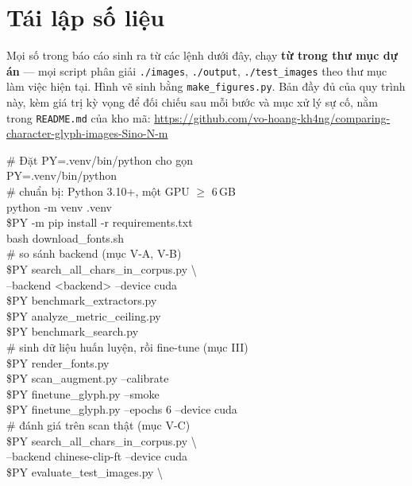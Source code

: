 \documentclass[conference,a4paper]{IEEEtran}
\newcommand{\code}[1]{{\small\texttt{#1}}}
\begin{document}
\appendices
\section{Tái lập số liệu}

Mọi số trong báo cáo sinh ra từ các lệnh dưới đây, chạy \textbf{từ trong thư mục dự án} --- mọi
script phân giải \code{./images}, \code{./output}, \code{./test\_images} theo thư mục làm việc hiện
tại. Hình vẽ sinh bằng \code{make\_figures.py}. Bản đầy đủ của quy trình này, kèm giá trị kỳ vọng
để đối chiếu sau mỗi bước và mục xử lý sự cố, nằm trong \code{README.md} của kho mã:
\url{https://github.com/vo-hoang-kh4ng/comparing-character-glyph-images-Sino-N-m}

{\footnotesize\ttfamily\raggedright
\# Đặt PY=.venv/bin/python cho gọn\\
PY=.venv/bin/python\\[4pt]
\# chuẩn bị: Python 3.10+, một GPU $\geq$ 6\,GB\\
python -m venv .venv\\
\$PY -m pip install -r requirements.txt\\
bash download\_fonts.sh\\[4pt]
\# so sánh backend (mục V-A, V-B)\\
\$PY search\_all\_chars\_in\_corpus.py \textbackslash\\
\hspace*{1em}--backend <backend> --device cuda\\
\$PY benchmark\_extractors.py\\
\$PY analyze\_metric\_ceiling.py\\
\$PY benchmark\_search.py\\[4pt]
\# sinh dữ liệu huấn luyện, rồi fine-tune (mục III)\\
\$PY render\_fonts.py\\
\$PY scan\_augment.py --calibrate\\
\$PY finetune\_glyph.py --smoke\\
\$PY finetune\_glyph.py --epochs 6 --device cuda\\[4pt]
\# đánh giá trên scan thật (mục V-C)\\
\$PY search\_all\_chars\_in\_corpus.py \textbackslash\\
\hspace*{1em}--backend chinese-clip-ft --device cuda\\
\$PY evaluate\_test\_images.py \textbackslash\\
}
\end{document}
